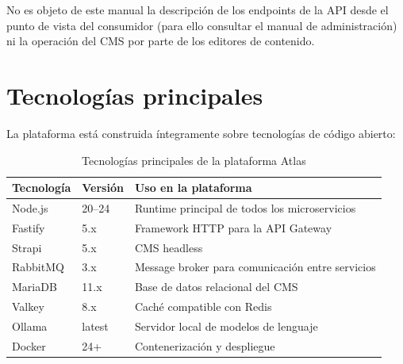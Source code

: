 No es objeto de este manual la descripción de los endpoints de la API desde el punto de vista del consumidor (para ello consultar el manual de administración) ni la operación del CMS por parte de los editores de contenido.

\section{Tecnologías principales}

La plataforma está construida íntegramente sobre tecnologías de código abierto:

\begin{table}[H]
  \centering
  \begin{tabularx}{\textwidth}{llX}
    \toprule
    \textbf{Tecnología} & \textbf{Versión} & \textbf{Uso en la plataforma} \\
    \midrule
    Node.js      & 20–24   & Runtime principal de todos los microservicios \\
    Fastify      & 5.x     & Framework HTTP para la API Gateway \\
    Strapi       & 5.x     & CMS headless \\
    RabbitMQ     & 3.x     & Message broker para comunicación entre servicios \\
    MariaDB      & 11.x    & Base de datos relacional del CMS \\
    Valkey       & 8.x     & Caché compatible con Redis \\
    Ollama       & latest  & Servidor local de modelos de lenguaje \\
    Docker       & 24+     & Contenerización y despliegue \\
    \bottomrule
  \end{tabularx}
  \caption{Tecnologías principales de la plataforma Atlas}
  \label{tab:tecnologias}
\end{table}
